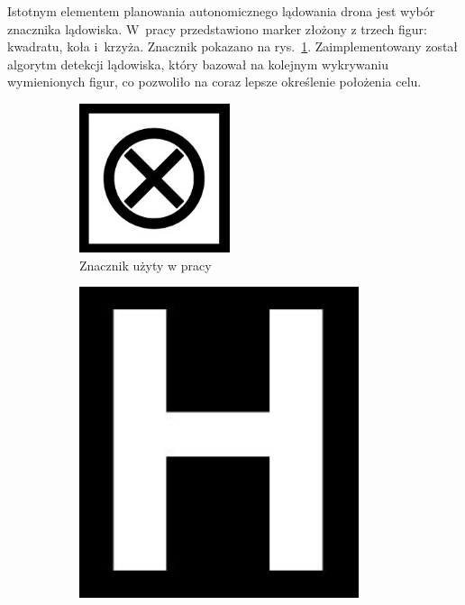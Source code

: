 Istotnym elementem planowania autonomicznego lądowania drona jest wybór znacznika lądowiska. 
W~pracy \cite{Falanga} przedstawiono marker złożony z trzech figur: kwadratu, koła i~krzyża. 
Znacznik pokazano na rys.~\ref{fig:znacznik_falanga}. 
Zaimplementowany został algorytm detekcji lądowiska, który bazował na kolejnym wykrywaniu wymienionych figur, co pozwoliło na coraz lepsze określenie położenia celu.
\begin{figure}
	\centering
		
		\begin{subfigure}{0.3\textwidth}
		\centering
		\includegraphics[width=\textwidth]{znacznik_falanga.jpg}
		\caption{Znacznik użyty w pracy \cite{Falanga}}
		\label{fig:znacznik_falanga}
		\end{subfigure}%
		\begin{subfigure}{0.3\textwidth}
		\centering
		\includegraphics[width=0.9\textwidth]{znacznik_H.jpg}

\end{subfigure}
\end{figure}
